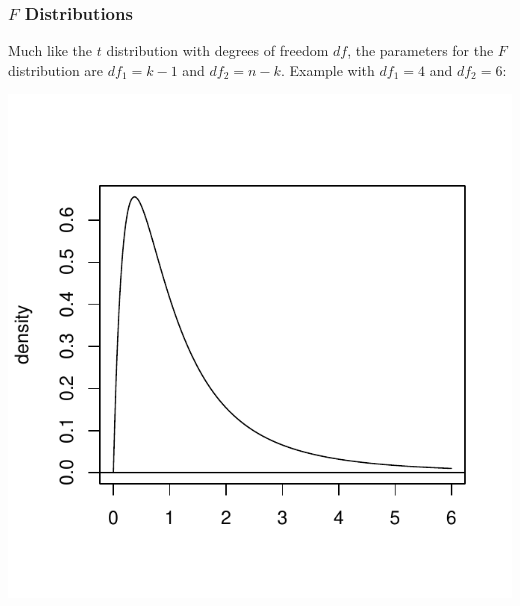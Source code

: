 \documentclass[handout]{beamer}
\begin{document}
\begin{frame}
\frametitle{$F$ Distributions}
Much like the $t$ distribution with degrees of freedom $df$, the parameters for the $F$ distribution are $df_1=k-1$ and $df_2=n-k$.  Example with $df_1 = 4$ and $df_2=6$:
\begin{center}
\includegraphics{figure/lec22-009}
\end{center}
\end{frame}
\end{document}
